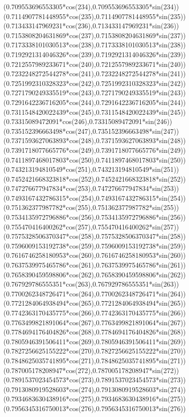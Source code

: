 {({0.709553696553305*cos(234)},{0.709553696553305*sin(234)})
({0.7114907781448955*cos(235)},{0.7114907781448955*sin(235)})
({0.713433147969231*cos(236)},{0.713433147969231*sin(236)})
({0.7153808204631869*cos(237)},{0.7153808204631869*sin(237)})
({0.7173338101030513*cos(238)},{0.7173338101030513*sin(238)})
({0.7192921314046326*cos(239)},{0.7192921314046326*sin(239)})
({0.7212557989233671*cos(240)},{0.7212557989233671*sin(240)})
({0.7232248272544278*cos(241)},{0.7232248272544278*sin(241)})
({0.7251992310328323*cos(242)},{0.7251992310328323*sin(242)})
({0.7271790249335519*cos(243)},{0.7271790249335519*sin(243)})
({0.7291642236716205*cos(244)},{0.7291642236716205*sin(244)})
({0.7311548420022439*cos(245)},{0.7311548420022439*sin(245)})
({0.73315089472091*cos(246)},{0.73315089472091*sin(246)})
({0.735152396663498*cos(247)},{0.735152396663498*sin(247)})
({0.7371593627063893*cos(248)},{0.7371593627063893*sin(248)})
({0.7391718077665776*cos(249)},{0.7391718077665776*sin(249)})
({0.7411897468017803*cos(250)},{0.7411897468017803*sin(250)})
({0.743213194810549*cos(251)},{0.743213194810549*sin(251)})
({0.7452421668323818*cos(252)},{0.7452421668323818*sin(252)})
({0.747276677947834*cos(253)},{0.747276677947834*sin(253)})
({0.7493167432786315*cos(254)},{0.7493167432786315*sin(254)})
({0.751362377987782*cos(255)},{0.751362377987782*sin(255)})
({0.7534135972796886*cos(256)},{0.7534135972796886*sin(256)})
({0.755470416400262*cos(257)},{0.755470416400262*sin(257)})
({0.7575328506370347*cos(258)},{0.7575328506370347*sin(258)})
({0.7596009153192738*cos(259)},{0.7596009153192738*sin(259)})
({0.7616746258180953*cos(260)},{0.7616746258180953*sin(260)})
({0.7637539975465786*cos(261)},{0.7637539975465786*sin(261)})
({0.7658390459598806*cos(262)},{0.7658390459598806*sin(262)})
({0.767929786555351*cos(263)},{0.767929786555351*sin(263)})
({0.7700262348726471*cos(264)},{0.7700262348726471*sin(264)})
({0.7721284064938494*cos(265)},{0.7721284064938494*sin(265)})
({0.7742363170435775*cos(266)},{0.7742363170435775*sin(266)})
({0.7763499821891064*cos(267)},{0.7763499821891064*sin(267)})
({0.7784694176404826*cos(268)},{0.7784694176404826*sin(268)})
({0.7805946391506411*cos(269)},{0.7805946391506411*sin(269)})
({0.7827256625155222*cos(270)},{0.7827256625155222*sin(270)})
({0.7848625035741895*cos(271)},{0.7848625035741895*sin(271)})
({0.787005178208947*cos(272)},{0.787005178208947*sin(272)})
({0.7891537023454573*cos(273)},{0.7891537023454573*sin(273)})
({0.7913080919528603*cos(274)},{0.7913080919528603*sin(274)})
({0.7934683630438916*cos(275)},{0.7934683630438916*sin(275)})
({0.7956345316750013*cos(276)},{0.7956345316750013*sin(276)})
}
